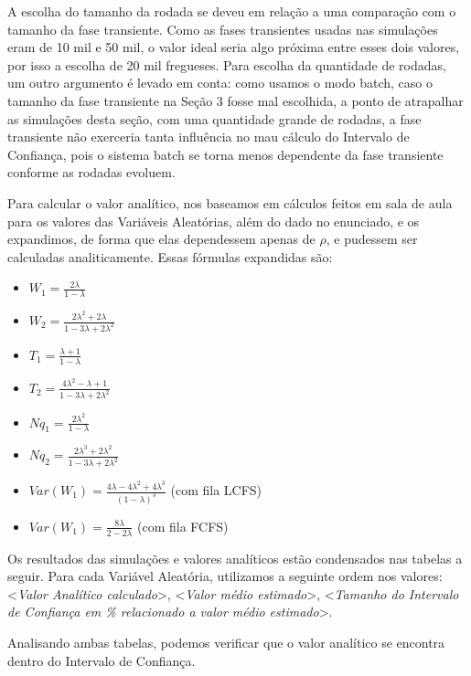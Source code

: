 \documentclass[a4paper,10pt]{article}
\begin{document}
	A escolha do tamanho da rodada se deveu em relação a uma comparação com o tamanho da fase transiente. Como as fases transientes usadas nas simulações
eram de 10 mil e 50 mil, o valor ideal seria algo próxima entre esses dois valores, por isso a escolha de 20 mil fregueses. Para escolha da quantidade
de rodadas, um outro argumento é levado em conta: como usamos o modo batch, caso o tamanho da fase transiente na Seção 3 fosse mal escolhida, a ponto de atrapalhar
as simulações desta seção, com uma quantidade grande de rodadas, a fase transiente não exerceria tanta influência no mau cálculo do Intervalo de Confiança, pois
o sistema batch se torna menos dependente da fase transiente conforme as rodadas evoluem.

    Para calcular o valor analítico, nos baseamos em cálculos feitos em sala de aula para os valores das Variáveis Aleatórias, além do dado no enunciado, e os
expandimos, de forma que elas dependessem apenas de $\rho$, e pudessem ser calculadas analiticamente. Essas fórmulas expandidas são:
    \begin{itemize}
        \item $W_1 = \frac{2 \lambda}{1 - \lambda} $
        \item $W_2 = \frac{2 \lambda ^2 + 2 \lambda}{1 - 3 \lambda + 2 \lambda ^2} $
        \item $T_1 = \frac{\lambda + 1}{1 - \lambda} $
        \item $T_2 = \frac{4 \lambda ^2 - \lambda + 1} {1 - 3 \lambda + 2 \lambda ^2} $
        \item $Nq_1 = \frac{2 \lambda ^2}{1 - \lambda} $
        \item $Nq_2 = \frac{2 \lambda ^3 + 2 \lambda ^2}{1 - 3 \lambda + 2 \lambda ^2} $
        \item $Var(W_1) = \frac{4 \lambda - 4 \lambda ^2 + 4 \lambda ^3}{(1 - \lambda)^3} $ (com fila LCFS)
        \item $Var(W_1) = \frac{8 \lambda}{2 - 2 \lambda} $ (com fila FCFS)
    \end{itemize}

    Os resultados das simulações e valores analíticos estão condensados nas tabelas a seguir. Para cada Variável Aleatória, utilizamos a seguinte ordem nos valores:
<\emph{Valor Analítico calculado}>, <\emph{Valor médio estimado}>, <\emph{Tamanho do Intervalo de Confiança em \% relacionado a valor médio estimado}>.

    Analisando ambas tabelas, podemos verificar que o valor analítico se encontra dentro do Intervalo de Confiança.
\end{document}
